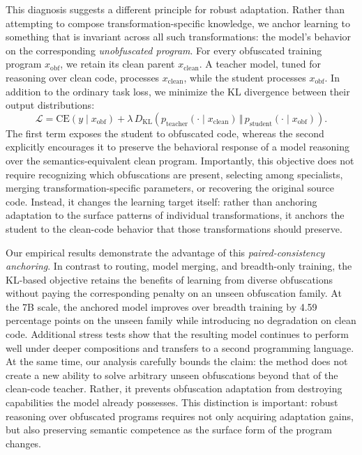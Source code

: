 This diagnosis suggests a different principle for robust adaptation.
Rather than attempting to compose transformation-specific knowledge,
we anchor learning to something that is invariant across all such
transformations: the model's behavior on the corresponding
\emph{unobfuscated program}. For every obfuscated training program
$x_{\mathrm{obf}}$, we retain its clean parent
$x_{\mathrm{clean}}$. A teacher model, tuned for reasoning over clean
code, processes $x_{\mathrm{clean}}$, while the student processes
$x_{\mathrm{obf}}$. In addition to the ordinary task loss, we minimize
the KL divergence between their output distributions:
%
\begin{equation}
\mathcal{L}
=
\mathrm{CE}\!\left(y \mid x_{\mathrm{obf}}\right)
+
\lambda\,
D_{\mathrm{KL}}\!\left(
p_{\mathrm{teacher}}(\cdot \mid x_{\mathrm{clean}})
\,\Vert\,
p_{\mathrm{student}}(\cdot \mid x_{\mathrm{obf}})
\right).
\label{eq:paired_consistency}
\end{equation}
%
The first term exposes the student to obfuscated code, whereas the
second explicitly encourages it to preserve the behavioral response of
a model reasoning over the semantics-equivalent clean program.
Importantly, this objective does not require recognizing which
obfuscations are present, selecting among specialists, merging
transformation-specific parameters, or recovering the original source
code. Instead, it
changes the learning target itself: rather than anchoring adaptation to
the surface patterns of individual transformations, it anchors the
student to the clean-code behavior that those transformations should
preserve.

Our empirical results demonstrate the advantage of this
\emph{paired-consistency anchoring}. In contrast to routing, model merging, and breadth-only training, the KL-based objective retains the
benefits of learning from diverse obfuscations without paying the
corresponding penalty on an unseen obfuscation family. At the 7B scale,
the anchored model improves over breadth training by 4.59 percentage
points on the unseen family while introducing no degradation on clean
code. Additional stress tests show that the resulting model continues
to perform well under deeper compositions and transfers to a second
programming language. At the same time, our analysis carefully bounds
the claim: the method does not create a new ability to solve arbitrary
unseen obfuscations beyond that of the clean-code teacher. Rather, it
prevents obfuscation adaptation from destroying capabilities the model
already possesses. This distinction is important: robust reasoning
over obfuscated programs requires not only acquiring adaptation gains,
but also preserving semantic competence as the surface form of the
program changes.

